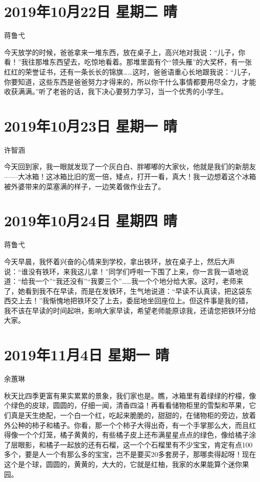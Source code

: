 \section{2019年10月22日 星期二 晴}

蒋鲁弋

今天放学的时候，爸爸拿来一堆东西，放在桌子上，高兴地对我说：``儿子，你看！''我往那堆东西望去，吃惊地看着。那堆里面有个``领头雁''的大奖杯，有一张红红的荣誉证书，还有一条长长的锦旗\ldots\ldots 这时，爸爸语重心长地跟我说：``儿子，你要知道，这些东西是爸爸努力才得来的，所以你干什么事情都要用尽全力，才能收获满满。''听了老爸的话，我下决心要努力学习，当一个优秀的小学生。

\section{2019年10月23日 星期一 晴}

许智涵

今天回到家，我一眼就发现了一个灰白白、胖嘟嘟的大家伙，他就是我们的新朋友------大冰箱！这冰箱比旧的宽一倍，矮点，打开一看，真大！我一边想着这个冰箱被外婆带来的菜塞满的样子，一边笑着做作业去了。

\section{2019年10月24日 星期四 晴}

蒋鲁弋

今天早晨，我怀着兴奋的心情来到学校，拿出铁环，放在桌子上，然后大声说：``谁没有铁环，来我这儿拿！''同学们呼啦一下围了上来，你一言我一语地说道：``给我一个''``我还没有''``我要三个''\ldots\ldots 我一个个地分给大家。这时，老师来了，她看到我不在早读，而是在发铁环，生气地说道：``早读不认真读，把这袋东西交上去！''我惭愧地把铁环交了上去，委屈地坐回座位上。但这件事是我的错，我不该在早读的时间起哄，影响大家早读，希望老师能原谅我，还请您把铁环分给大家。

\section{2019年11月4日 星期一 晴}

余蕙琳

秋天比四季更富有果实累累的景象，我们家也是。瞧，冰箱里有着绿绿的柠檬，像个绿色的皮球，圆圆的，仔细一闻，清香四溢！再看看储物柜里的雪梨和苹果，它们真是天生绝配，一个白一个红，吃起来脆脆的，甜甜的，在储物柜的旁边，放着外公种的柿子和橘子。你看，那一个个柿子大得出奇，有一个手掌那么大，而且红得像一个个灯笼，橘子黄黄的，有些橘子皮上还布满星星点点的绿色，像给橘子涂了层眼影，和橘子一起放的还有石榴，这一个个石榴里有不少宝宝，肯定有点100多个，要是人一个有那么多的宝宝，岂不是要买20多套房子，那哪卖得起呀！现在这个是个球，圆圆的，黄黄的，大大的，它就是红柚，我家的水果能算个迷你果园。


